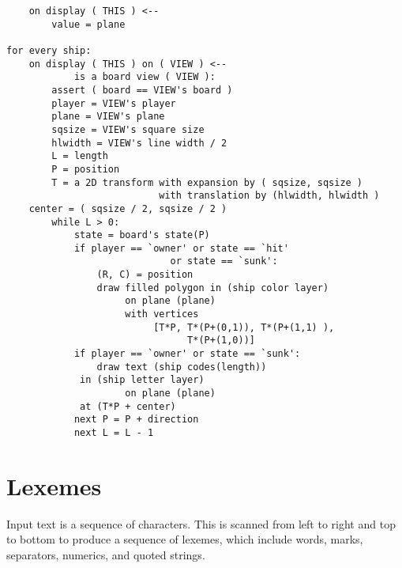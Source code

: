 \documentclass[12pt]{article}
\begin{document}
\begin{verbatim}
    on display ( THIS ) <--
        value = plane

for every ship:
    on display ( THIS ) on ( VIEW ) <--
            is a board view ( VIEW ):
        assert ( board == VIEW's board )
        player = VIEW's player
        plane = VIEW's plane
        sqsize = VIEW's square size
        hlwidth = VIEW's line width / 2
        L = length
        P = position
        T = a 2D transform with expansion by ( sqsize, sqsize )
                           with translation by (hlwidth, hlwidth )
	center = ( sqsize / 2, sqsize / 2 )
        while L > 0:
            state = board's state(P)
            if player == `owner' or state == `hit'
	                         or state == `sunk':
                (R, C) = position
                draw filled polygon in (ship color layer)
                     on plane (plane)
                     with vertices
                          [T*P, T*(P+(0,1)), T*(P+(1,1) ),
                                T*(P+(1,0))]
            if player == `owner' or state == `sunk':
                draw text (ship codes(length))
		     in (ship letter layer)
                     on plane (plane)
		     at (T*P + center)
            next P = P + direction
            next L = L - 1
\end{verbatim}


\newpage

\section{Lexemes}

Input text is a sequence of characters.  This is scanned from
left to right and top to bottom to produce a sequence of lexemes,
which include words, marks, separators, numerics, and quoted strings.
\end{document}
